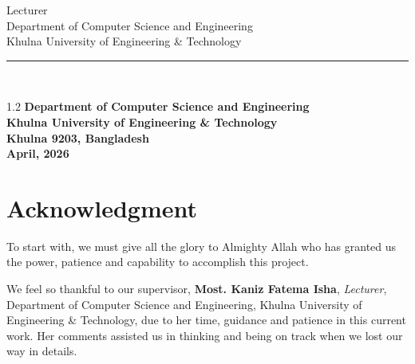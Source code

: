 \documentclass[12pt,a4paper]{report}
\begin{document}
\vspace{30pt}   %


\vspace{6pt}

\noindent\hspace{0.8in}%
\begin{minipage}[t]{3.6in}
  {\fontsize{12}{18}\selectfont\normalfont
  Lecturer\\
  Department of Computer Science and Engineering\\
  Khulna University of Engineering \& Technology}
\end{minipage}%
\hfill%
\begin{minipage}[t]{1.3in}
  \vspace{28pt}
  \rule{1.3in}{0.4pt}\\[4pt]
\end{minipage}


\begin{center}
\begin{spacing}{1.2}
	{\fontsize{12}{14.4}\selectfont\bfseries
		Department of Computer Science and Engineering\\
		Khulna University of Engineering \& Technology\\
		Khulna 9203, Bangladesh\\
		April, 2026}
\end{spacing}
\end{center}

\newpage

\chapter*{Acknowledgment}

\vspace{24pt}

To start with, we must give all the glory to Almighty Allah who has granted us the power, patience and capability to accomplish this project.

We feel so thankful to our supervisor, \textbf{Most. Kaniz Fatema Isha}, \textit{Lecturer}, Department of Computer Science and Engineering, Khulna University of Engineering \& Technology, due to her time, guidance and patience in this current work. Her comments assisted us in thinking and being on track when we lost our way in details.
\end{document}
